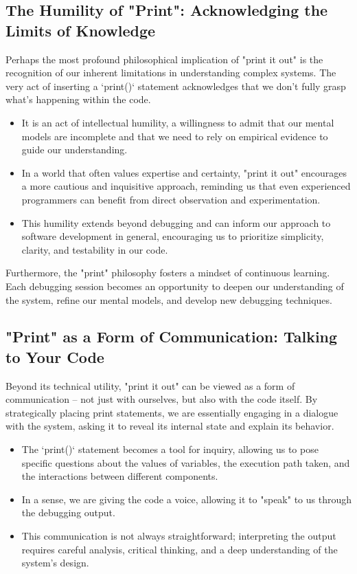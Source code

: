 \documentclass{article}
\begin{document}
{{{{\subsection*{The Humility of "Print": Acknowledging the Limits of Knowledge}

Perhaps the most profound philosophical implication of "print it out" is the recognition of our inherent limitations in understanding complex systems. The very act of inserting a `print()` statement acknowledges that we don't fully grasp what's happening within the code.

\begin{itemize}
    \item It is an act of intellectual humility, a willingness to admit that our mental models are incomplete and that we need to rely on empirical evidence to guide our understanding.
    \item In a world that often values expertise and certainty, "print it out" encourages a more cautious and inquisitive approach, reminding us that even experienced programmers can benefit from direct observation and experimentation.
    \item This humility extends beyond debugging and can inform our approach to software development in general, encouraging us to prioritize simplicity, clarity, and testability in our code.
\end{itemize}

Furthermore, the "print" philosophy fosters a mindset of continuous learning. Each debugging session becomes an opportunity to deepen our understanding of the system, refine our mental models, and develop new debugging techniques.

\subsection*{"Print" as a Form of Communication: Talking to Your Code}

Beyond its technical utility, "print it out" can be viewed as a form of communication – not just with ourselves, but also with the code itself. By strategically placing print statements, we are essentially engaging in a dialogue with the system, asking it to reveal its internal state and explain its behavior.

\begin{itemize}
    \item The `print()` statement becomes a tool for inquiry, allowing us to pose specific questions about the values of variables, the execution path taken, and the interactions between different components.
    \item In a sense, we are giving the code a voice, allowing it to "speak" to us through the debugging output.
    \item This communication is not always straightforward; interpreting the output requires careful analysis, critical thinking, and a deep understanding of the system's design.
\end{itemize}

}}}}
\end{document}
